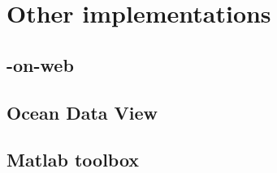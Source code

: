 \chapter{Other implementations\label{chap:divaonweb}}

\lettrine[lines=2, loversize=-0.1, lraise=0.1]{}{} 

\minitoc

\newpage %

\section{\diva-on-web}


\section{Ocean Data View}


\section{Matlab toolbox}
